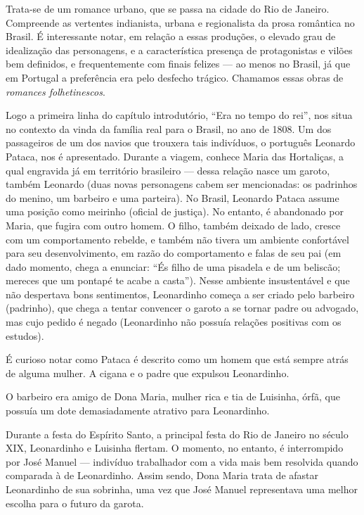 \documentclass[12pt]{book}
\begin{document}
				\par Trata-se de um romance urbano, que se passa na cidade do Rio de Janeiro. Compreende as vertentes indianista, urbana e regionalista da prosa romântica no Brasil. É interessante notar, em relação a essas produções, o elevado grau de idealização das personagens, e a característica presença de protagonistas e vilões bem definidos, e frequentemente com finais felizes — ao menos no Brasil, já que em Portugal a preferência era pelo desfecho trágico. Chamamos essas obras de \textit{romances folhetinescos}.
				\par Logo a primeira linha do capítulo introdutório, ``Era no tempo do rei'', nos situa no contexto da vinda da família real para o Brasil, no ano de 1808. Um dos passageiros de um dos navios que trouxera tais indivíduos, o português Leonardo Pataca, nos é apresentado. Durante a viagem, conhece Maria das Hortaliças, a qual engravida já em território brasileiro — dessa relação nasce um garoto, também Leonardo (duas novas personagens cabem ser mencionadas: os padrinhos do menino, um barbeiro e uma parteira). No Brasil, Leonardo Pataca assume uma posição como meirinho (oficial de justiça). No entanto, é abandonado por Maria, que fugira com outro homem. O filho, também deixado de lado, cresce com um comportamento rebelde, e também não tivera um ambiente confortável para seu desenvolvimento, em razão do comportamento e falas de seu pai (em dado momento, chega a enunciar: ``És filho de uma pisadela e de um beliscão; mereces que um pontapé te acabe a casta''). Nesse ambiente insustentável e que não despertava bons sentimentos, Leonardinho começa a ser criado pelo barbeiro (padrinho), que chega a tentar convencer o garoto a se tornar padre ou advogado, mas cujo pedido é negado (Leonardinho não possuía relações positivas com os estudos).
				\par É curioso notar como Pataca é descrito como um homem que está sempre atrás de alguma mulher. A cigana e o padre que expulsou Leonardinho.
				\par O barbeiro era amigo de Dona Maria, mulher rica e tia de Luisinha, órfã, que possuía um dote demasiadamente atrativo para Leonardinho.
				\par Durante a festa do Espírito Santo, a principal festa do Rio de Janeiro no século XIX, Leonardinho e Luisinha flertam. O momento, no entanto, é interrompido por José Manuel — indivíduo trabalhador com a vida mais bem resolvida quando comparada à de Leonardinho. Assim sendo, Dona Maria trata de afastar Leonardinho de sua sobrinha, uma vez que José Manuel representava uma melhor escolha para o futuro da garota.
\end{document}

